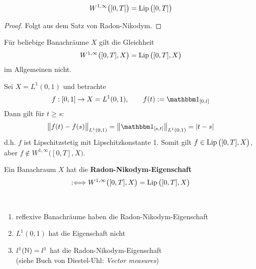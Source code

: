 \begin{satz}\label{satzRademacher}
	\begin{align*}
		W^{1,\infty}\big([0,T]\big)=\operatorname{Lip}\big([0,T]\big)
	\end{align*}
\end{satz}

\begin{proof}
	Folgt aus dem Satz von Radon-Nikodym.
\end{proof}

Für beliebige Banachräume $X$ gilt die Gleichheit
\begin{align*}
	W^{1,\infty}\big([0,T],X\big)=\operatorname{Lip}\big([0,T],X\big)
\end{align*}
im Allgemeinen nicht.

\begin{beispiel}
	Sei $X=L^1(0,1)$ und betrachte
	\begin{align*}
		f:[0,1]\to X=L^1(0,1),\qquad f(t):=\indi_{[0,t]}
	\end{align*}
	Dann gilt für $t\geq s$:
	\begin{align*}
		\big\Vert f(t)-f(s)\big\Vert_{L^1(0,1)}
		=\left\Vert\indi_{[s,t]}\right\Vert_{L^1(0,1)}
		=|t-s|
	\end{align*}
	d.h. $f$ ist Lipschitzstetig mit Lipschitzkonstante 1.
	Somit gilt $f\in\operatorname{Lip}\big([0,T],X\big)$, aber $f\not\in W^{1,\infty}\big([0,T],X\big)$.
\end{beispiel}

\begin{definition}
	Ein Banachraum $X$ hat die \textbf{Radon-Nikodym-Eigenschaft}
	\begin{align*}
		:\Longleftrightarrow W^{1,\infty}\big([0,T],X\big)=\operatorname{Lip}\big([0,T],X\big)
	\end{align*}
\end{definition}

\begin{beispiel}\
	\begin{enumerate}
		\item reflexive Banachräume haben die Radon-Nikodym-Eigenschaft
		\item $L^1(0,1)$ hat die Eigenschaft nicht
		\item $l^1(\mathbb{N})=l^1$ hat die Radon-Nikodym-Eigenschaft\\
		(siehe Buch von Diestel-Uhl: \textit{Vector measures})
	\end{enumerate}
\end{beispiel}

